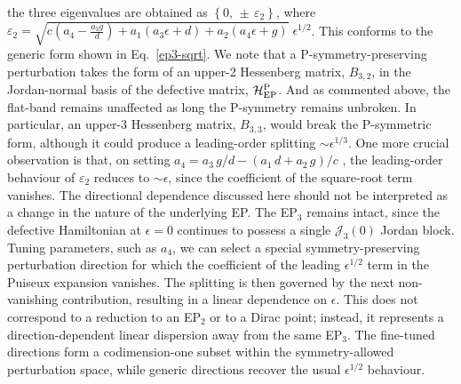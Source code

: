 \documentclass[aps, prb, onecolumn, nofootinbib, citeautoscript, 10pt]{revtex4-2}
\begin{document}
the three eigenvalues are obtained as $\left\{0, \, \pm \,\varepsilon_2 \right\}$, where $ \varepsilon_2 =
 \sqrt{c \left(a_4-\frac{a_3 g}{d}\right)+a_1 \left(a_3 \epsilon +d\right)+a_2 \left(a_4 \epsilon +g\right)}\; \epsilon^{1/2} $. This conforms to the generic form shown in Eq.~\eqref{ep3-sqrt}. We note that a P-symmetry-preserving perturbation takes the form of an upper-2 Hessenberg matrix, $B_{3,2}$, in the Jordan-normal basis of the defective matrix, ${\mathcal H^{\rm P}_{\rm EP}} $. And as commented above, the flat-band remains unaffected as long the P-symmetry remains unbroken. In particular, an upper-3 Hessenberg matrix, $B_{3,3}$, would break the P-symmetric form, although it could produce a leading-order splitting $\sim \epsilon^{1/3}$. One more crucial observation is that, on setting $ a_4 =  {a_3\, g}/{d}
-(a_1\, d + a_2 \,g) / {c} $ , the leading-order behaviour of $\varepsilon_2$ reduces to $\sim \epsilon $, since the coefficient of the square-root term vanishes.
The directional dependence discussed here should not be interpreted as a change in the nature of the underlying EP. The EP$_3$ remains intact, since the defective Hamiltonian at $\epsilon=0$ continues to possess a single $\mathcal{J}_3(0)$ Jordan block. Tuning parameters, such as $a_4$, we can select a special symmetry-preserving perturbation direction for which the coefficient of the leading $\epsilon^{1/2}$ term in the Puiseux expansion vanishes. The splitting is then governed by the next non-vanishing contribution, resulting in a linear dependence on $\epsilon$. This does not correspond to a reduction to an EP$_2$ or to a Dirac point; instead, it represents a direction-dependent linear dispersion away from the same EP$_3$. The fine-tuned directions form a codimension-one subset within the symmetry-allowed perturbation space, while generic directions recover the usual $\epsilon^{1/2}$ behaviour.
\end{document}
